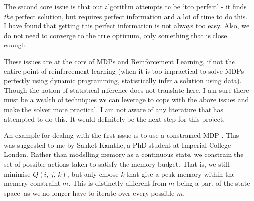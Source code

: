 The second core issue is that our algorithm attempts to be `too perfect' - it finds \textit{the} perfect solution, but requires perfect information and a lot of time to do this.
I have found that getting this perfect information is not always too easy.
Also, we do not need to converge to the true optimum, only something that is close enough.

These issues are at the core of MDPs and Reinforcement Learning, if not the entire point of reinforcement learning (when it is too impractical to solve MDPs perfectly using dynamic programming, statistically infer a solution using data).
Though the notion of statistical inference does not translate here, I am sure there must be a wealth of techniques we can leverage to cope with the above issues and make the solver more practical.
I am not aware of any literature that has attempted to do this.
It would definitely be the next step for this project.

An example for dealing with the first issue is to use a constrained MDP \cite{Altman1999-constrained-mdps}.
This was suggested to me by Sanket Kamthe, a PhD student at Imperial College London.
Rather than modelling memory as a continuous state, we constrain the set of possible actions taken to satisfy the memory budget.
That is, we still minimise \(Q(i,\,j,\,k)\), but only choose \(k\) that give a peak memory within the memory constraint \(m\).
This is distinctly different from \(m\) being a part of the state space, as we no longer have to iterate over every possible \(m\).
